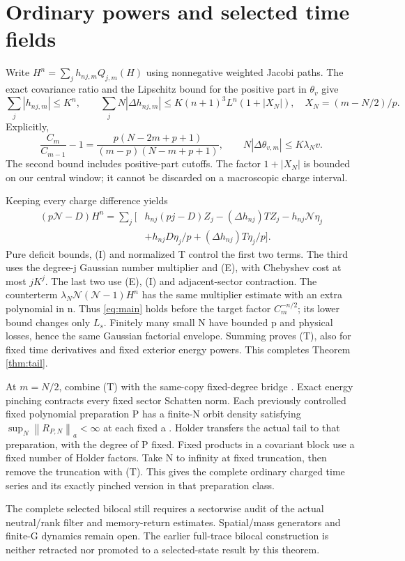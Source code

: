 \documentclass[11pt]{article}
\newcommand{\Ncal}{\mathcal N}
\newcommand{\norm}[1]{\left\lVert#1\right\rVert}
\begin{document}
\section{Ordinary powers and selected time fields}
Write $H^n=\sum_jh_{nj,m}Q_{j,m}(H)$ using nonnegative weighted
Jacobi paths. The exact covariance ratio and the Lipschitz
bound for the positive part in $\theta_v$ give \cite{charged}
\[
 \sum_j|h_{nj,m}|\le K^n,\qquad
 \sum_jN|\Delta h_{nj,m}|
 \le K(n+1)^3L^n(1+|X_N|),\quad X_N=(m-N/2)/p. \tag{I}
\]
Explicitly,
\[
 \frac{C_m}{C_{m-1}}-1
 =\frac{p(N-2m+p+1)}{(m-p)(N-m+p+1)},\qquad
 N|\Delta\theta_{v,m}|\le K\lambda_Nv.
\]
The second bound includes positive-part cutoffs. The factor
$1+|X_N|$ is bounded on our central window; it cannot be
discarded on a macroscopic charge interval.

Keeping every charge difference yields
\begin{align}
 (p\Ncal-D)H^n=\sum_j\bigl[&
 h_{nj}(pj-D)Z_j-(\Delta h_{nj})TZ_j-h_{nj}\Ncal\eta_j
 \nonumber\\
 &+h_{nj}D\eta_j/p+(\Delta h_{nj})T\eta_j/p\bigr]. \tag{O}
\end{align}
Pure deficit bounds, (I) and normalized T control the first two
terms. The third uses the degree-j Gaussian number multiplier
and (E), with Chebyshev cost at most $jK^j$. The last two use
(E), (I) and adjacent-sector contraction. The counterterm
$\lambda_N\Ncal(\Ncal-1)H^n$ has the same multiplier estimate
with an extra polynomial in n. Thus \eqref{eq:main} holds before
the target factor $C_m^{-n/2}$; its lower bound changes only
$L_s$. Finitely many small N have bounded p and physical
losses, hence the same Gaussian factorial envelope. Summing
proves (T), also for fixed time derivatives and fixed exterior
energy powers. This completes Theorem \ref{thm:tail}.

At $m=N/2$, combine (T) with the same-copy fixed-degree bridge
\cite{central}. Exact energy pinching contracts every fixed
sector Schatten norm. Each previously controlled fixed
polynomial preparation P has a finite-N orbit density satisfying
$\sup_N\norm{R_{P,N}}_a<\infty$ at each fixed a \cite{prep}.
Holder transfers the actual tail to that preparation, with the
degree of P fixed. Fixed products in a covariant block use
a fixed number of Holder factors. Take N to infinity at fixed
truncation, then remove the truncation with (T). This gives the
complete ordinary charged time series and its exactly pinched
version in that preparation class.

The complete selected bilocal still requires a sectorwise audit
of the actual neutral/rank filter and memory-return estimates.
Spatial/mass generators and finite-G dynamics remain open.
The earlier full-trace bilocal construction is neither retracted
nor promoted to a selected-state result by this theorem.
\end{document}
